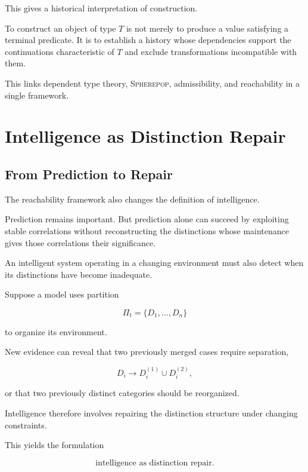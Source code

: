 \documentclass[11pt]{article}
\theoremstyle{remark}
\newcommand{\Spherepop}{\textsc{Spherepop}}
\begin{document}
This gives a historical interpretation of construction.

To construct an object of type $T$ is not merely to produce a value satisfying a terminal predicate. It is to establish a history whose dependencies support the continuations characteristic of $T$ and exclude transformations incompatible with them.

This links dependent type theory, \Spherepop{}, admissibility, and reachability in a single framework.

\section{Intelligence as Distinction Repair}

\subsection{From Prediction to Repair}

The reachability framework also changes the definition of intelligence.

Prediction remains important. But prediction alone can succeed by exploiting stable correlations without reconstructing the distinctions whose maintenance gives those correlations their significance.

An intelligent system operating in a changing environment must also detect when its distinctions have become inadequate.

Suppose a model uses partition

\begin{equation}
\Pi_t
=
\{D_1,\ldots,D_n\}
\end{equation}

to organize its environment.

New evidence can reveal that two previously merged cases require separation,

\begin{equation}
D_i
\rightarrow
D_i^{(1)}
\cup
D_i^{(2)},
\end{equation}

or that two previously distinct categories should be reorganized.

Intelligence therefore involves repairing the distinction structure under changing constraints.

This yields the formulation

\begin{equation}
\boxed{
\text{intelligence as distinction repair}.
}
\end{equation}
\end{document}
